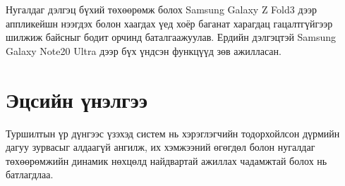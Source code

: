Нугалдаг дэлгэц бүхий төхөөрөмж болох Samsung Galaxy Z Fold3 дээр
аппликейшн нээгдэх болон хаагдах үед хоёр баганат
харагдац гацалтгүйгээр шилжиж байсныг бодит
орчинд баталгаажуулав. Ердийн дэлгэцтэй
Samsung Galaxy Note20 Ultra дээр бүх үндсэн
функцүүд зөв ажилласан.
\section{Эцсийн үнэлгээ}
Туршилтын үр дүнгээс үзэхэд систем нь хэрэглэгчийн тодорхойлсон дүрмийн дагуу зурвасыг алдаагүй ангилж, их хэмжээний өгөгдөл болон нугалдаг төхөөрөмжийн динамик нөхцөлд найдвартай ажиллах чадамжтай болох нь батлагдлаа.
